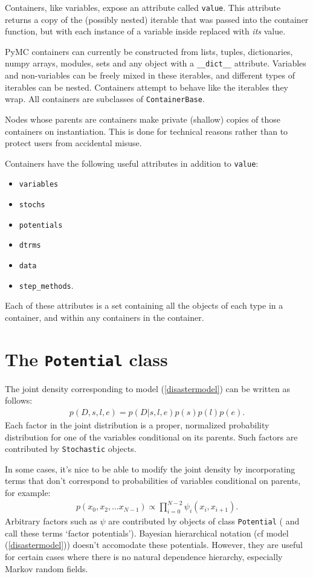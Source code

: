 Containers, like variables, expose an attribute called \texttt{value}. This attribute returns a copy of the (possibly nested) iterable that was passed into the container function, but with each instance of a variable inside replaced with \emph{its} value. 

PyMC containers can currently be constructed from lists, tuples, dictionaries, numpy arrays, modules, sets and any object with a \texttt{__dict__} attribute. Variables and non-variables can be freely mixed in these iterables, and different types of iterables can be nested. Containers attempt to behave like the iterables they wrap. All containers are subclasses of \texttt{ContainerBase}. 

Nodes whose parents are containers make private (shallow) copies of those containers on instantiation. This is done for technical reasons rather than to protect users from accidental misuse.

Containers have the following useful attributes in addition to \texttt{value}:
\begin{itemize}
    \item\texttt{variables}
    \item\texttt{stochs}
    \item\texttt{potentials}
    \item\texttt{dtrms}
    \item\texttt{data}
    \item\texttt{step_methods}.
\end{itemize}
Each of these attributes is a set containing all the objects of each type in a container, and within any containers in the container.

\section{The \texttt{Potential} class}


The joint density corresponding to model (\ref{disastermodel}) can be written as follows:
\begin{eqnarray*}
    p(D,s,l,e) = p(D|s,l,e) p(s) p(l) p(e).
\end{eqnarray*}
Each factor in the joint distribution is a proper, normalized probability distribution for one of the variables conditional on its parents. Such factors are contributed by \texttt{Stochastic} objects.

In some cases, it's nice to be able to modify the joint density by incorporating terms that don't correspond to probabilities of variables conditional on parents, for example:
\begin{eqnarray*}
    p(x_0, x_2, \ldots x_{N-1}) \propto \prod_{i=0}^{N-2} \psi_i(x_i, x_{i+1}).
\end{eqnarray*}
Arbitrary factors such as $\psi$ are contributed by objects of class \texttt{Potential} (\cite{dawidmarkov} and \cite{jordangraphical} call these terms `factor potentials'). Bayesian hierarchical notation (cf model (\ref{disastermodel})) doesn't accomodate these potentials. However, they are useful for certain cases where there is no natural dependence hierarchy, especially Markov random fields.

